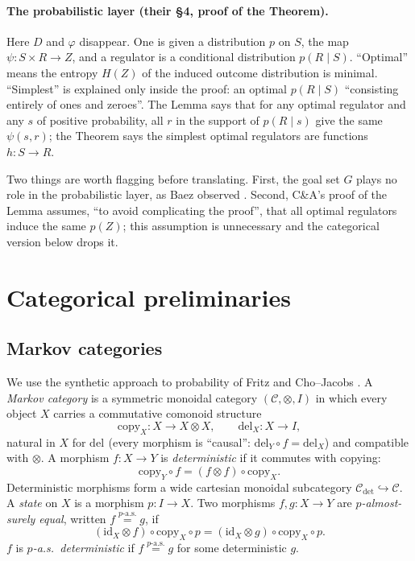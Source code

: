 \documentclass[11pt,a4paper]{article}
\theoremstyle{definition}
\theoremstyle{remark}
\newcommand{\cC}{\mathcal{C}}
\newcommand{\copym}[1]{\mathrm{copy}_{#1}}
\newcommand{\delm}[1]{\mathrm{del}_{#1}}
\newcommand{\id}{\mathrm{id}}
\newcommand{\aseq}[1]{\overset{#1\text{-a.s.}}{=}}
\begin{document}
\paragraph{The probabilistic layer (their \S4, proof of the Theorem).}
Here $D$ and $\varphi$ disappear. One is given a distribution $p$ on $S$, the
map $\psi\colon S\times R\to Z$, and a regulator is a conditional distribution
$p(R\mid S)$. ``Optimal'' means the entropy $H(Z)$ of the induced outcome
distribution is minimal. ``Simplest'' is explained only inside the proof: an
optimal $p(R\mid S)$ ``consisting entirely of ones and zeroes''. The Lemma
says that for any optimal regulator and any $s$ of positive probability, all
$r$ in the support of $p(R\mid s)$ give the same $\psi(s,r)$; the Theorem says
the simplest optimal regulators are functions $h\colon S\to R$.

Two things are worth flagging before translating. First, the goal set $G$ plays
no role in the probabilistic layer, as Baez observed \cite{Baez2016}. Second,
C\&A's proof of the Lemma assumes, ``to avoid complicating the proof'', that all
optimal regulators induce the same $p(Z)$; this assumption is unnecessary and
the categorical version below drops it.

\section{Categorical preliminaries}

\subsection{Markov categories}

We use the synthetic approach to probability of Fritz \cite{Fritz2020} and
Cho--Jacobs \cite{ChoJacobs2019}. A \emph{Markov category} is a symmetric
monoidal category $(\cC,\otimes,I)$ in which every object $X$ carries a
commutative comonoid structure
\[
\copym{X}\colon X\to X\otimes X,\qquad \delm{X}\colon X\to I,
\]
natural in $X$ for $\delm{}$ (every morphism is ``causal'': $\delm{Y}\circ f=\delm{X}$) and compatible with $\otimes$. A morphism $f\colon X\to Y$ is
\emph{deterministic} if it commutes with copying:
\begin{equation}\label{eq:det}
\copym{Y}\circ f=(f\otimes f)\circ\copym{X}.
\end{equation}
Deterministic morphisms form a wide cartesian monoidal subcategory
$\cC_{\mathrm{det}}\hookrightarrow\cC$. A \emph{state} on $X$ is a morphism
$p\colon I\to X$. Two morphisms $f,g\colon X\to Y$ are \emph{$p$-almost-surely
equal}, written $f\aseq{p}g$, if
\begin{equation}\label{eq:as}
(\id_X\otimes f)\circ\copym{X}\circ p=(\id_X\otimes g)\circ\copym{X}\circ p .
\end{equation}
$f$ is \emph{$p$-a.s.\ deterministic} if $f\aseq{p}g$ for some deterministic $g$.
\end{document}
